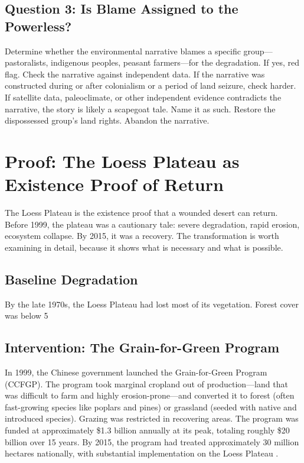 \documentclass[12pt,a4paper]{article}
\begin{document}
\subsection{Question 3: Is Blame Assigned to the Powerless?}

Determine whether the environmental narrative blames a specific group—pastoralists, indigenous peoples, peasant farmers—for the degradation. If yes, red flag. Check the narrative against independent data. If the narrative was constructed during or after colonialism or a period of land seizure, check harder. If satellite data, paleoclimate, or other independent evidence contradicts the narrative, the story is likely a scapegoat tale. Name it as such. Restore the dispossessed group's land rights. Abandon the narrative.

\section{Proof: The Loess Plateau as Existence Proof of Return}

The Loess Plateau is the existence proof that a wounded desert can return. Before 1999, the plateau was a cautionary tale: severe degradation, rapid erosion, ecosystem collapse. By 2015, it was a recovery. The transformation is worth examining in detail, because it shows what is necessary and what is possible.

\subsection{Baseline Degradation}

By the late 1970s, the Loess Plateau had lost most of its vegetation. Forest cover was below 5%

\subsection{Intervention: The Grain-for-Green Program}

In 1999, the Chinese government launched the Grain-for-Green Program (CCFGP). The program took marginal cropland out of production—land that was difficult to farm and highly erosion-prone—and converted it to forest (often fast-growing species like poplars and pines) or grassland (seeded with native and introduced species). Grazing was restricted in recovering areas. The program was funded at approximately \$1.3 billion annually at its peak, totaling roughly \$20 billion over 15 years. By 2015, the program had treated approximately 30 million hectares nationally, with substantial implementation on the Loess Plateau \citep{Feng:2016}.
\end{document}
